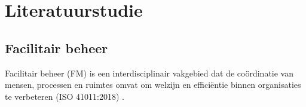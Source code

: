 
\section{Literatuurstudie}%
\label{sec:literatuurstudie}
%
%
%
%
%
%
%


\subsection{Facilitair beheer}
Facilitair beheer (FM) is een interdisciplinair vakgebied dat de coördinatie van mensen, processen en ruimtes omvat om welzijn en efficiëntie binnen organisaties te verbeteren (ISO 41011:2018) \autocite{jaouhari2023we}. 

